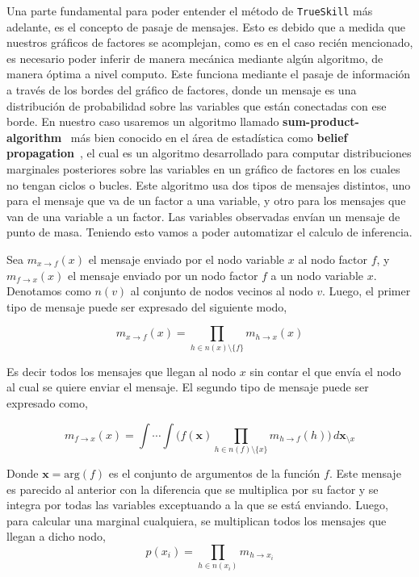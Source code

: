\documentclass[11pt,twoside,spanish]{report} %
\begin{document}
Una parte fundamental para poder entender el m\'etodo de \texttt{TrueSkill} m\'as adelante, es el concepto de pasaje de mensajes.
Esto es debido que a medida que nuestros gr\'aficos de factores se acomplejan, como es en el caso reci\'en mencionado, es necesario poder inferir de manera mec\'anica mediante alg\'un algoritmo, de manera \'optima a nivel computo.
Este funciona mediante el pasaje de informaci\'on a trav\'es de los bordes del gr\'afico de factores, donde un mensaje es una distribuci\'on de probabilidad sobre las variables que est\'an conectadas con ese borde.
En nuestro caso usaremos un algoritmo llamado \textbf{sum-product-algorithm}~\cite{Kschischang2001} m\'as bien conocido en el \'area de estad\'istica como \textbf{belief propagation}~\cite{pearl1986-beliefNetworks}, el cual es un algoritmo desarrollado para computar distribuciones marginales posteriores sobre las variables en un gr\'afico de factores en los cuales no tengan ciclos o bucles.
Este algoritmo usa dos tipos de mensajes distintos, uno para el mensaje que va de un factor a una variable,  y otro para los mensajes que van de una variable a un factor.
Las variables observadas env\'ian un mensaje de punto de masa.
Teniendo esto vamos a poder automatizar el calculo de inferencia.

Sea $m_{x \rightarrow f}(x)$ el mensaje enviado por el nodo variable $x$ al nodo factor $f$, y $m_{f \rightarrow x}(x)$ el mensaje enviado por un nodo factor $f$ a un nodo variable $x$.
Denotamos como $n(v)$ al conjunto de nodos vecinos al nodo $v$.
Luego, el primer tipo de mensaje puede ser expresado del siguiente modo,

\begin{equation}\label{eq:m_v_f}
m_{x \rightarrow f}(x) = \prod_{h \in n(x) \setminus \{f\} } m_{h \rightarrow x}(x)
\end{equation}

Es decir todos los mensajes que llegan al nodo $x$ sin contar el que env\'ia el nodo al cual se quiere enviar el mensaje.
El segundo tipo de mensaje puede ser expresado como,

\begin{equation}\label{eq:m_f_v}
m_{f \rightarrow x}(x) = \int \cdots \int \Big( f(\bm{x}) \prod_{h \in n(f) \setminus \{x\} } m_{h \rightarrow f}(h) \Big) \,  d\bm{x}_{\setminus x}
\end{equation}

Donde $\bm{x} = \text{arg}(f)$ es el conjunto de argumentos de la funci\'on $f$.
Este mensaje es parecido al anterior con la diferencia que se multiplica por su factor y se integra por todas las variables exceptuando a la que se est\'a enviando.
Luego, para calcular una marginal cualquiera, se multiplican todos los mensajes que llegan a dicho nodo,
\begin{equation}\label{eq:marginal}
p(x_i) = \prod_{h \in n(x_i)} m_{h \rightarrow x_i}
\end{equation}
\end{document}
